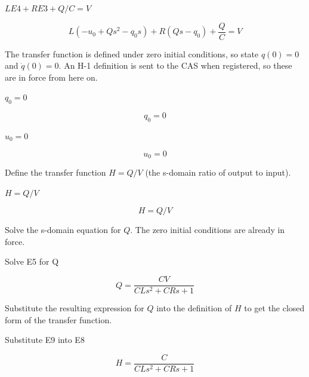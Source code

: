 \documentclass[dvipdfmx]{article}
\begin{document}
$L E4 + R E3 + Q/C = V$

\begin{equation}
  L \left(-u_{0}+Q s^2-q_{0} s\right)+R \left(Q s-q_{0}\right)+\frac{Q}{C}=V
  \label{eq:E5}
\end{equation}

The transfer function is defined under zero initial conditions, so state $q(0)=0$ and $\dot q(0)=0$. An H-1 definition is sent to the CAS when registered, so these are in force from here on.

$q_0 = 0$

\begin{equation}
  q_0 = 0
  \label{eq:E6}
\end{equation}

$u_0 = 0$

\begin{equation}
  u_0 = 0
  \label{eq:E7}
\end{equation}

Define the transfer function $H=Q/V$ (the s-domain ratio of output to input).

$H = Q/V$

\begin{equation}
  H = Q/V
  \label{eq:E8}
\end{equation}

Solve the s-domain equation for $Q$. The zero initial conditions are already in force.

Solve E5 for Q

\begin{equation}
  Q = \frac{C V}{C L s^2+C R s+1}
  \label{eq:E9}
\end{equation}

Substitute the resulting expression for $Q$ into the definition of $H$ to get the closed form of the transfer function.

Substitute E9 into E8

\begin{equation}
  H = \frac{C}{C L s^2+C R s+1}
  \label{eq:E10}
\end{equation}
\end{document}

